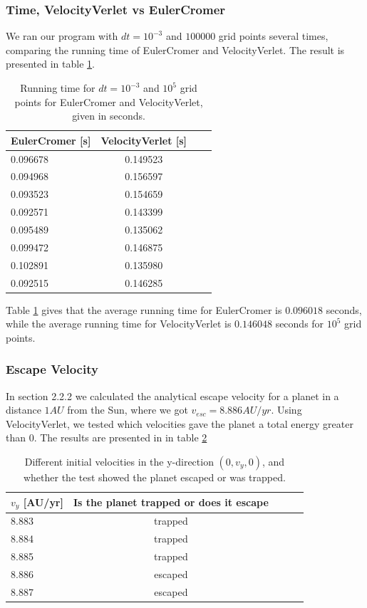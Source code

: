 \documentclass[norsk,a4paper,12pt]{article}
\begin{document}
{\subsubsection{Time, VelocityVerlet vs EulerCromer}
We ran our program with $dt = 10^{-3}$ and $100000$ grid points several times, comparing the running time of EulerCromer and VelocityVerlet. The result is presented in table \ref{timeTable}.

\begin{table} [H]
\centering
\caption{Running time for $dt=10^{-3}$ and $10^{5}$ grid points for EulerCromer and VelocityVerlet, given in seconds.}
\begin{tabularx}{\textwidth}{XccX} \toprule
    \bf EulerCromer [s] & \bf VelocityVerlet [s] \\ \hline
    0.096678 & 0.149523\\ \hline
    0.094968 & 0.156597\\ \hline
    0.093523 & 0.154659\\ \hline
    0.092571 & 0.143399\\ \hline
    0.095489 & 0.135062\\ \hline
    0.099472 & 0.146875\\ \hline
    0.102891 & 0.135980\\ \hline
    0.092515 & 0.146285\\ \bottomrule
\end{tabularx}
\label{timeTable}
\end{table}

Table \ref{timeTable} gives that the average running time for EulerCromer is $0.096018$ seconds, while the average running time for VelocityVerlet is $0.146048$ seconds for $10^{5}$ grid points.

\subsubsection{Escape Velocity}
In section 2.2.2 we calculated the analytical escape velocity for a planet in a distance $1 AU$ from the Sun, where we got $v_{esc} = 8.886 AU/yr$. Using VelocityVerlet, we tested which velocities gave the planet a total energy greater than 0. The results are presented in in table \ref{trappedTable}

\begin{table} [H]
\centering
\caption{Different initial velocities in the y-direction $(0,v_y,0)$, and whether the test showed the planet escaped or was trapped.}
\begin{tabularx}{\textwidth}{XcXcX} \toprule
    $v_y$ [AU/yr] & \bf Is the planet trapped or does it escape \\ \hline
    8.883 & trapped \\ \hline
    8.884 & trapped \\ \hline
    8.885 & trapped \\ \hline
    8.886 & escaped \\ \hline
    8.887 & escaped \\ \bottomrule
\end{tabularx}
\label{trappedTable}
\end{table}

}
\end{document}

